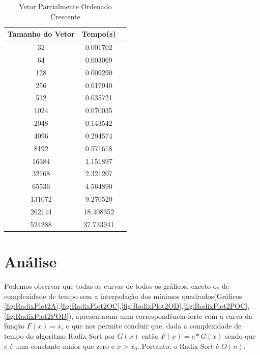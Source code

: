 \documentclass[12pt,a4paper,twoside]{report}
\begin{document}
\begin{table}[h]
  \centering
  \caption{Vetor Parcialmente Ordenado Crescente \label{tab:poc}}
  \begin{tabular}{ccc} \\\hline
  \textbf{Tamanho do Vetor}  & \textbf{Tempo(s)} \\\hline
  32                              & 0.001702          \\\hline
  64                              & 0.003069          \\\hline
  128                             & 0.009290         \\\hline
  256                             & 0.017940          \\\hline
  512                             & 0.035721         \\\hline
  1024                            & 0.070035          \\\hline
  2048                            & 0.143542          \\\hline
  4096                            & 0.294574
  \\\hline
  8192                            & 0.571618
  \\\hline
  16384                           & 1.151897
  \\\hline
  32768                           & 2.321207          \\\hline
  65536                           & 4.564890          \\\hline
  131072                          & 9.270520          \\\hline
  262144                          & 18.408352          \\\hline
  524288                          & 37.733941          \\\hline
  \end{tabular}
\end{table}


\chapter{Análise}

Podemos observar que todas as curvas de todos os gráficos, exceto os de complexidade de tempo sem a interpolação dos mínimos quadrados(Gráficos \ref{fig:RadixPlot2A},\ref{fig:RadixPlot2OC},\ref{fig:RadixPlot2OD},\ref{fig:RadixPlot2POC},\ref{fig:RadixPlot2POD}), apresentaram uma correspondência forte com a curva da função $F(x) = x$, o que nos permite concluir que, dada a complexidade de tempo do algoritmo Radix Sort por $G(x)$ então $F(x) = c * G(x)$ sendo que $c$ é uma constante maior que zero e $x > x_0$. Portanto, o Radix Sort é $O(n)$.
\end{document}
